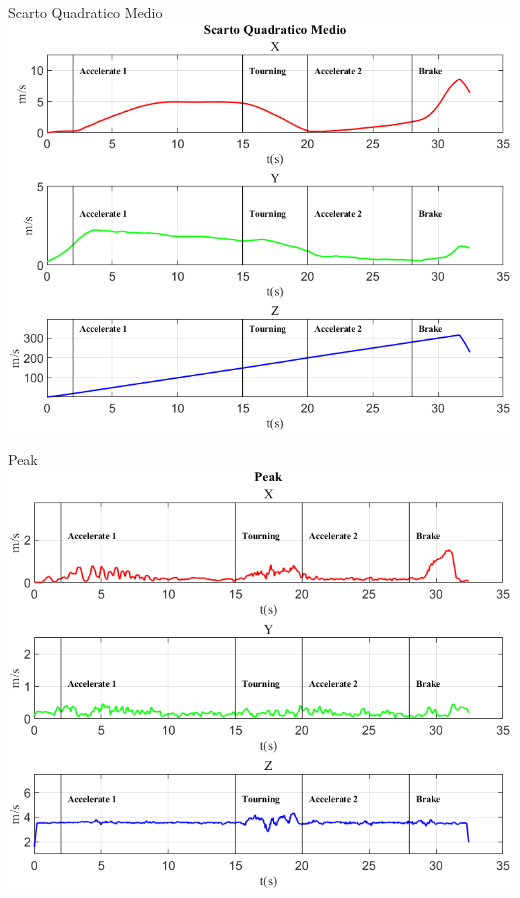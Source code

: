 \documentclass[beamer]{standalone}
\begin{document}
	
	\begin{frame}{{Scarto Quadratico Medio}}
		\centering\includegraphics[height=.8\textheight]{figure/Vel/Scarto Quadratico Medio}
	\end{frame}
	
%	
	
	\begin{frame}{{Peak}}
		\centering\includegraphics[height=.8\textheight]{figure/Vel/Peak}
	\end{frame}
	
\end{document}
